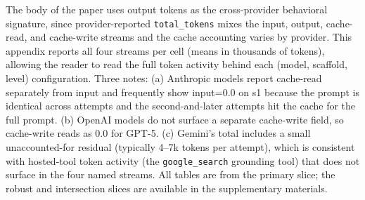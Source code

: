 \documentclass[10pt]{article} %
\begin{document}
    The body of the paper uses output tokens as the cross-provider behavioral signature, since provider-reported \texttt{total\_tokens} mixes the input, output, cache-read, and cache-write streams and the cache accounting varies by provider. This appendix reports all four streams per cell (means in thousands of tokens), allowing the reader to read the full token activity behind each (model, scaffold, level) configuration. Three notes: (a) Anthropic models report cache-read separately from input and frequently show input=0.0 on s1 because the prompt is identical across attempts and the second-and-later attempts hit the cache for the full prompt. (b) OpenAI models do not surface a separate cache-write field, so cache-write reads as 0.0 for GPT-5. (c) Gemini's total includes a small unaccounted-for residual (typically 4--7k tokens per attempt), which is consistent with hosted-tool token activity (the \texttt{google\_search} grounding tool) that does not surface in the four named streams. All tables are from the primary slice; the robust and intersection slices are available in the supplementary materials.
\end{document}

